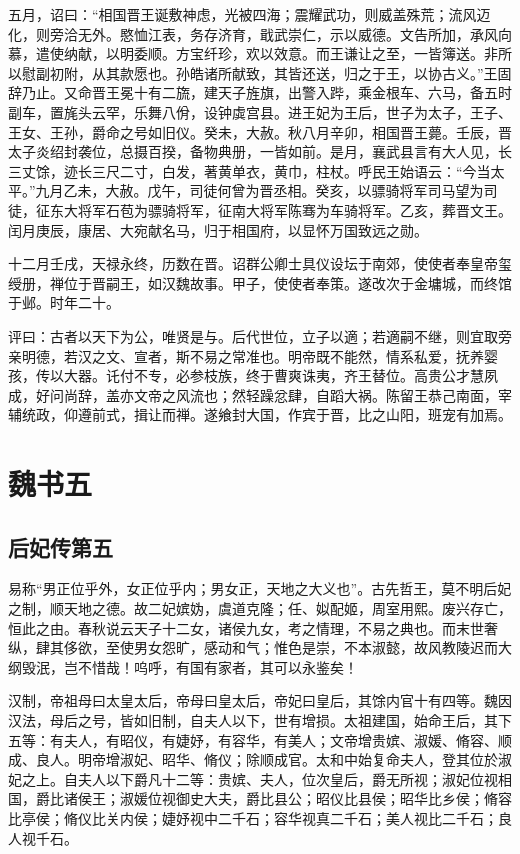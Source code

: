 \documentclass[12pt,UTF8]{ctexbook}
\begin{document}
五月，诏曰：“相国晋王诞敷神虑，光被四海；震耀武功，则威盖殊荒；流风迈化，则旁洽无外。愍恤江表，务存济育，戢武崇仁，示以威德。文告所加，承风向慕，遣使纳献，以明委顺。方宝纤珍，欢以效意。而王谦让之至，一皆簿送。非所以慰副初附，从其款愿也。孙皓诸所献致，其皆还送，归之于王，以协古义。”王固辞乃止。又命晋王冕十有二旒，建天子旌旗，出警入跸，乘金根车、六马，备五时副车，置旄头云罕，乐舞八佾，设钟虡宫县。进王妃为王后，世子为太子，王子、王女、王孙，爵命之号如旧仪。癸未，大赦。秋八月辛卯，相国晋王薨。壬辰，晋太子炎绍封袭位，总摄百揆，备物典册，一皆如前。是月，襄武县言有大人见，长三丈馀，迹长三尺二寸，白发，著黄单衣，黄巾，柱杖。呼民王始语云：“今当太平。”九月乙未，大赦。戊午，司徒何曾为晋丞相。癸亥，以骠骑将军司马望为司徒，征东大将军石苞为骠骑将军，征南大将军陈骞为车骑将军。乙亥，葬晋文王。闰月庚辰，康居、大宛献名马，归于相国府，以显怀万国致远之勋。

十二月壬戌，天禄永终，历数在晋。诏群公卿士具仪设坛于南郊，使使者奉皇帝玺绶册，禅位于晋嗣王，如汉魏故事。甲子，使使者奉策。遂改次于金墉城，而终馆于邺。时年二十。

评曰：古者以天下为公，唯贤是与。后代世位，立子以適；若適嗣不继，则宜取旁亲明德，若汉之文、宣者，斯不易之常准也。明帝既不能然，情系私爱，抚养婴孩，传以大器。讬付不专，必参枝族，终于曹爽诛夷，齐王替位。高贵公才慧夙成，好问尚辞，盖亦文帝之风流也；然轻躁忿肆，自蹈大祸。陈留王恭己南面，宰辅统政，仰遵前式，揖让而禅。遂飨封大国，作宾于晋，比之山阳，班宠有加焉。

\part{魏书五}

\chapter{后妃传第五}

易称“男正位乎外，女正位乎内；男女正，天地之大义也”。古先哲王，莫不明后妃之制，顺天地之德。故二妃嫔妫，虞道克隆；任、姒配姬，周室用熙。废兴存亡，恒此之由。春秋说云天子十二女，诸侯九女，考之情理，不易之典也。而末世奢纵，肆其侈欲，至使男女怨旷，感动和气；惟色是崇，不本淑懿，故风教陵迟而大纲毁泯，岂不惜哉！呜呼，有国有家者，其可以永鉴矣！

汉制，帝祖母曰太皇太后，帝母曰皇太后，帝妃曰皇后，其馀内官十有四等。魏因汉法，母后之号，皆如旧制，自夫人以下，世有增损。太祖建国，始命王后，其下五等：有夫人，有昭仪，有婕妤，有容华，有美人；文帝增贵嫔、淑媛、脩容、顺成、良人。明帝增淑妃、昭华、脩仪；除顺成官。太和中始复命夫人，登其位於淑妃之上。自夫人以下爵凡十二等：贵嫔、夫人，位次皇后，爵无所视；淑妃位视相国，爵比诸侯王；淑媛位视御史大夫，爵比县公；昭仪比县侯；昭华比乡侯；脩容比亭侯；脩仪比关内侯；婕妤视中二千石；容华视真二千石；美人视比二千石；良人视千石。
\end{document}
